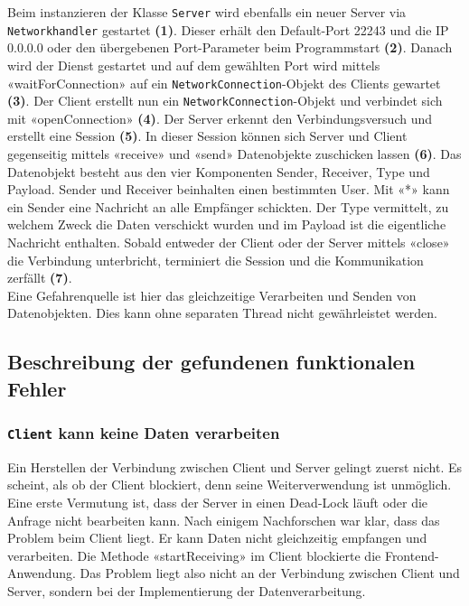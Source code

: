 \documentclass[10pt, hyperref, a4paper]{article}
\begin{document}
Beim instanzieren der Klasse \texttt{Server} wird ebenfalls ein neuer Server via \texttt{Networkhandler} gestartet \textbf{(1)}. Dieser erhält den Default-Port 22243 und die IP 0.0.0.0 oder den übergebenen Port-Parameter beim Programmstart \textbf{(2)}. Danach wird der Dienst gestartet und auf dem gewählten Port wird mittels «waitForConnection» auf ein \texttt{NetworkConnection}-Objekt des Clients gewartet \textbf{(3)}. Der Client erstellt nun ein \texttt{NetworkConnection}-Objekt und verbindet sich mit «openConnection» \textbf{(4)}. Der Server erkennt den Verbindungsversuch und erstellt eine Session \textbf{(5)}. In dieser Session können sich Server und Client gegenseitig mittels «receive» und «send» Datenobjekte zuschicken lassen \textbf{(6)}. Das Datenobjekt besteht aus den vier Komponenten Sender, Receiver, Type und Payload. Sender und Receiver beinhalten einen bestimmten User. Mit «*» kann ein Sender eine Nachricht an alle Empfänger schickten. Der Type vermittelt, zu welchem Zweck die Daten verschickt wurden und im Payload ist die eigentliche Nachricht enthalten. Sobald entweder der Client oder der Server mittels «close» die Verbindung unterbricht, terminiert die Session und die Kommunikation zerfällt \textbf{(7)}.\\
Eine Gefahrenquelle ist hier das gleichzeitige Verarbeiten und Senden von Datenobjekten. Dies kann ohne separaten Thread nicht gewährleistet werden.





\subsection{Beschreibung der gefundenen funktionalen Fehler}\label{funk}

\subsubsection{\texttt{Client} kann keine Daten verarbeiten}
Ein Herstellen der Verbindung zwischen Client und Server gelingt zuerst nicht. Es scheint, als ob der Client blockiert, denn seine Weiterverwendung ist unmöglich. Eine erste Vermutung ist, dass der Server in einen Dead-Lock läuft oder die Anfrage nicht bearbeiten kann. Nach einigem Nachforschen war klar, dass das Problem beim Client liegt. Er kann Daten nicht gleichzeitig empfangen und verarbeiten. Die Methode «startReceiving» im Client blockierte die Frontend-Anwendung. Das Problem liegt also nicht an der Verbindung zwischen Client und Server, sondern bei der Implementierung der Datenverarbeitung.
\end{document}
